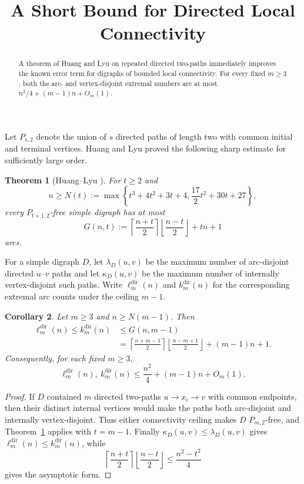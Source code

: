 \documentclass[10pt]{amsart}
\title{A Short Bound for Directed Local Connectivity}
\author{}
\date{}
\newtheorem{theorem}{Theorem}
\newtheorem{corollary}[theorem]{Corollary}
\theoremstyle{remark}
\newcommand{\ldir}{\ell^{\mathrm{dir}}}
\newcommand{\kdir}{k^{\mathrm{dir}}}
\begin{document}
\begin{abstract}
A theorem of Huang and Lyu on repeated directed two-paths immediately
improves the known error term for digraphs of bounded local connectivity.
For every fixed $m\ge3$, both the arc- and vertex-disjoint extremal numbers
are at most $n^2/4+(m-1)n+O_m(1)$.
\end{abstract}

\maketitle

Let $P_{s,2}$ denote the union of $s$ directed paths of length two with
common initial and terminal vertices.  Huang and Lyu proved the following
sharp estimate for sufficiently large order.

\begin{theorem}[Huang--Lyu \cite{HL}]\label{thm:HL}
For $t\ge2$ and
\[
 n\ge N(t):=\max\left\{t^3+4t^2+3t+4,
 \frac{17}{2}t^2+30t+27\right\},
\]
every $P_{t+1,2}$-free simple digraph has at most
\begin{equation}\label{eq:HL}
 G(n,t):=
 \left\lceil\frac{n+t}{2}\right\rceil
 \left\lfloor\frac{n-t}{2}\right\rfloor+tn+1
\end{equation}
arcs.
\end{theorem}

For a simple digraph $D$, let $\lambda_D(u,v)$ be the maximum number of
arc-disjoint directed $u$--$v$ paths and let $\kappa_D(u,v)$ be the maximum
number of internally vertex-disjoint such paths.  Write $\ldir_m(n)$ and
$\kdir_m(n)$ for the corresponding extremal arc counts under the ceiling
$m-1$.

\begin{corollary}\label{cor:main}
Let $m\ge3$ and $n\ge N(m-1)$.  Then
\begin{align*}
 \ldir_m(n)\le\kdir_m(n)
 &\le G(n,m-1)\\
 &=\left\lceil\frac{n+m-1}{2}\right\rceil
   \left\lfloor\frac{n-m+1}{2}\right\rfloor
   +(m-1)n+1.
\end{align*}
Consequently, for each fixed $m\ge3$,
\[
 \ldir_m(n),\ \kdir_m(n)
 \le \frac{n^2}{4}+(m-1)n+O_m(1).
\]
\end{corollary}

\begin{proof}
If $D$ contained $m$ directed two-paths $u\to x_i\to v$ with common
endpoints, then their distinct internal vertices would make the paths both
arc-disjoint and internally vertex-disjoint.  Thus either connectivity
ceiling makes $D$ $P_{m,2}$-free, and Theorem~\ref{thm:HL} applies with
$t=m-1$.  Finally $\kappa_D(u,v)\le\lambda_D(u,v)$ gives
$\ldir_m(n)\le\kdir_m(n)$, while
\[
 \left\lceil\frac{n+t}{2}\right\rceil
 \left\lfloor\frac{n-t}{2}\right\rfloor
 \le \frac{n^2-t^2}{4}
\]
gives the asymptotic form.
\end{proof}
\end{document}
